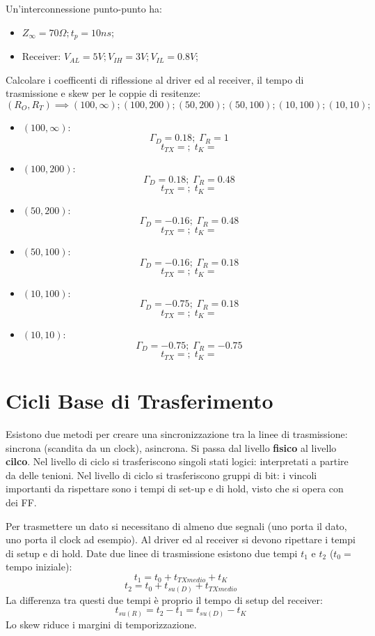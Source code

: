 \documentclass[12pt]{article}
\begin{document}
\begin{problem}{}{}
    Un'interconnessione punto-punto ha:
    \begin{itemize}
        \item $Z_{\infty} = 70\Omega; t_p = 10ns$;
        \item Receiver: $V_{AL} = 5V; V _{IH} = 3V; V _{IL} = 0.8V$;
    \end{itemize}
    Calcolare i coefficenti di riflessione al driver ed al receiver, il tempo di trasmissione e skew per le coppie di resitenze:
    \[ (R_O,R_T) \implies (100, \infty); (100, 200); (50, 200); (50, 100); (10, 100); (10, 10); \]
    \begin{itemize}
        \item $(100, \infty)$:
            \[ \Gamma_D = 0.18 ;\; \Gamma_R = 1 \]
            \[ t_{TX} =  ;\; t_K =   \]
        \item $(100, 200)$:
            \[ \Gamma_D = 0.18 ;\; \Gamma_R = 0.48 \]
            \[ t_{TX} =  ;\; t_K =   \]
        \item $(50, 200)$:
            \[ \Gamma_D = -0.16 ;\; \Gamma_R = 0.48  \]
            \[ t_{TX} =  ;\; t_K =   \]
        \item $(50, 100)$:
            \[ \Gamma_D =  -0.16 ;\; \Gamma_R =  0.18 \]
            \[ t_{TX} =  ;\; t_K =   \]
        \item $(10, 100)$:
            \[ \Gamma_D = -0.75 ;\; \Gamma_R = 0.18 \]
            \[ t_{TX} =  ;\; t_K =   \]
        \item $(10, 10)$:
            \[ \Gamma_D =  -0.75 ;\; \Gamma_R = -0.75 \]
            \[ t_{TX} =  ;\; t_K =   \]
    \end{itemize}
\end{problem}

\newpage
\section{Cicli Base di Trasferimento}
Esistono due metodi per creare una sincronizzazione tra la linee di trasmissione: sincrona (scandita da un clock), asincrona. Si passa dal livello \textbf{fisico} al livello \textbf{cilco}. Nel livello di ciclo si trasferiscono singoli stati logici: interpretati a partire da delle tenioni. Nel livello di ciclo si trasferiscono gruppi di bit: i vincoli importanti da rispettare sono i tempi di set-up e di hold, visto che si opera con dei FF.

Per trasmettere un dato si necessitano di almeno due segnali (uno porta il dato, uno porta il clock ad esempio). Al driver ed al receiver si devono ripettare i tempi di setup e di hold. Date due linee di trasmissione esistono due tempi $t_1$ e $t_2$ ($t_0 =$ tempo iniziale):
\[ t_1 = t_0 + t _{TXmedio} + t_K \]
\[ t_2 = t_0 + t_{su(D)} + t_{TXmedio} \]
La differenza tra questi due tempi \`e proprio il tempo di setup del receiver:
\[ t _{su(R)} = t_2 - t_1 = t _{su(D)} - t_K \]
Lo skew riduce i margini di temporizzazione.
\end{document}

